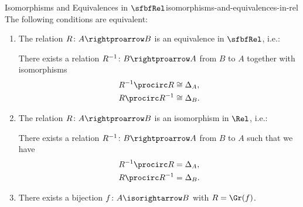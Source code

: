 \begin{proposition}{Isomorphisms and Equivalences in $\sfbfRel$}{isomorphisms-and-equivalences-in-rel}%
    The following conditions are equivalent:
    \begin{enumerate}
        \item\label{isomorphisms-and-equivalences-in-rel-1}The relation $R\colon A\rightproarrow B$ is an equivalence in $\sfbfRel$, i.e.:
            \begin{itemize}
                \itemstar There exists a relation $R^{-1}\colon B\rightproarrow A$ from $B$ to $A$ together with isomorphisms
                    \begin{align*}
                        R^{-1}\procirc R &\cong \Delta_{A},\\
                        R\procirc R^{-1} &\cong \Delta_{B}.
                    \end{align*}
            \end{itemize}
        \item\label{isomorphisms-and-equivalences-in-rel-2}The relation $R\colon A\rightproarrow B$ is an isomorphism in $\Rel$, i.e.:
            \begin{itemize}
                \itemstar There exists a relation $R^{-1}\colon B\rightproarrow A$ from $B$ to $A$ such that we have
                    \begin{align*}
                        R^{-1}\procirc R &= \Delta_{A},\\
                        R\procirc R^{-1} &= \Delta_{B}.
                    \end{align*}
            \end{itemize}
        \item\label{isomorphisms-and-equivalences-in-rel-3}There exists a bijection $f\colon A\isorightarrow B$ with $R=\Gr(f)$.
    \end{enumerate}
\end{proposition}
